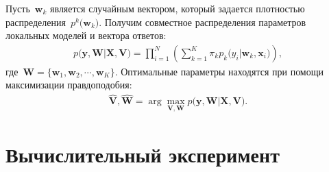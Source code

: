 \documentclass[12pt, twoside]{article}
\begin{document}
Пусть~$\mathbf{w}_k$ является случайным вектором, который задается плотностью распределения~$p^{k}\bigr(\mathbf{w}_k\bigr)$. Получим совместное распределения параметров локальных моделей и вектора ответов:
\[
\label{eq:st:3}
\begin{aligned}
p\bigr(\mathbf{y}, \mathbf{W}|\mathbf{X}, \mathbf{V}\bigr) = \prod_{i=1}^{N}\left(\sum_{k=1}^{K}\pi_{k}p_{k}\bigr(y_i|\mathbf{w}_k, \mathbf{x}_i\bigr)\right),
\end{aligned}
\]
где~$\mathbf{W} = \bigr\{\mathbf{w}_1, \mathbf{w}_2, \cdots, \mathbf{w}_K\bigr\}.$
Оптимальные параметры находятся при помощи максимизации правдоподобия:
\[
\label{eq:st:4}
\begin{aligned}
\hat{\mathbf{V}}, \hat{ \mathbf{W}} = \arg\max_{\mathbf{V}, \mathbf{W}} p\bigr(\mathbf{y},  \mathbf{W}|\mathbf{X}, \mathbf{V}\bigr).
\end{aligned}
\]

\section{Вычислительный эксперимент}
\end{document}
